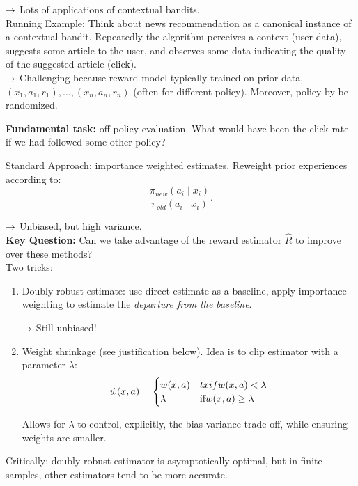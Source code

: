$\rightarrow$ Lots of applications of contextual bandits. \\

Running Example: Think about news recommendation as a canonical instance of a contextual bandit. Repeatedly the algorithm perceives a context (user data), suggests some article to the user, and observes some data indicating the quality of the suggested article (click). \\

$\rightarrow$ Challenging because reward model typically trained on prior data, $(x_1, a_1, r_1), \ldots, (x_n, a_n, r_n)$ (often for different policy). Moreover, policy by be randomized.

{\bf Fundamental task:} off-policy evaluation. What would have been the click rate if we had followed some other policy?

Standard Approach: importance weighted estimates. Reweight prior experiences according to:
\[
\frac{\pi_{new}(a_i \mid x_i)}{\pi_{old}(a_i \mid x_i)}.
\]

$\rightarrow$ Unbiased, but high variance. \\

{\bf Key Question:} Can we take advantage of the reward estimator $\hat{R}$ to improve over these methods? \\

Two tricks:
\begin{enumerate}
    \item Doubly robust estimate: use direct estimate as a baseline, apply importance weighting to estimate the {\it departure from the baseline}.
    
    $\rightarrow$ Still unbiased!
    
    \item Weight shrinkage (see justification below). Idea is to clip estimator with a parameter $\lambda$:
    \[
    \hat{w}(x,a) = \begin{cases}
    w(x,a)& tx{if} w(x,a) < \lambda\\
    \lambda& \text{if} w(x,a) \geq \lambda
    \end{cases}
    \]
    
    Allows for $\lambda$ to control, explicitly, the bias-variance trade-off, while ensuring weights are smaller.
\end{enumerate}


Critically: doubly robust estimator is asymptotically optimal, but in finite samples, other estimators tend to be more accurate. \\

